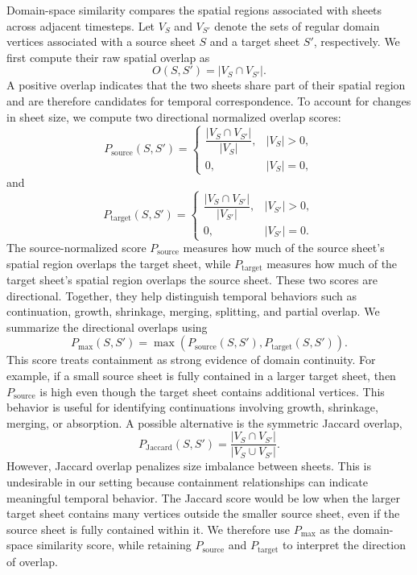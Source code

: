 \documentclass{vgtc}                          %
\newcommand{\Sheet}{S}
\begin{document}
Domain-space similarity compares the spatial regions associated with sheets across adjacent timesteps. Let $V_\Sheet$ and $V_{\Sheet'}$ denote the sets of regular domain vertices associated with a source sheet $\Sheet$ and a target sheet $\Sheet'$, respectively. We first compute their raw spatial overlap as
\[
O(\Sheet,\Sheet') = |V_\Sheet \cap V_{\Sheet'}|.
\]
A positive overlap indicates that the two sheets share part of their spatial region and are therefore candidates for temporal correspondence. To account for changes in sheet size, we compute two directional normalized overlap scores:
\[
P_\mathrm{source}(\Sheet,\Sheet') =
\begin{cases}
\dfrac{|V_\Sheet \cap V_{\Sheet'}|}{|V_\Sheet|}, & |V_\Sheet| > 0,\\
0, & |V_\Sheet| = 0,
\end{cases}
\]
and
\[
P_\mathrm{target}(\Sheet,\Sheet') =
\begin{cases}
\dfrac{|V_\Sheet \cap V_{\Sheet'}|}{|V_{\Sheet'}|}, & |V_{\Sheet'}| > 0,\\
0, & |V_{\Sheet'}| = 0.
\end{cases}
\]
The source-normalized score $P_\mathrm{source}$ measures how much of the source sheet's spatial region overlaps the target sheet, while $P_\mathrm{target}$ measures how much of the target sheet's spatial region overlaps the source sheet. These two scores are directional. Together, they help distinguish temporal behaviors such as continuation, growth, shrinkage, merging, splitting, and partial overlap. We summarize the directional overlaps using
\[
P_\mathrm{max}(\Sheet,\Sheet') =
\max(P_\mathrm{source}(\Sheet,\Sheet'),
P_\mathrm{target}(\Sheet,\Sheet')).
\]
This score treats containment as strong evidence of domain continuity. For example, if a small source sheet is fully contained in a larger target sheet, then $P_\mathrm{source}$ is high even though the target sheet contains additional vertices. This behavior is useful for identifying continuations involving growth, shrinkage, merging, or absorption. A possible alternative is the symmetric Jaccard overlap,
\[
P_\mathrm{Jaccard}(\Sheet,\Sheet') =
\frac{|V_\Sheet \cap V_{\Sheet'}|}
{|V_\Sheet \cup V_{\Sheet'}|}.
\]
However, Jaccard overlap penalizes size imbalance between sheets. This is undesirable in our setting because containment relationships can indicate meaningful temporal behavior. The Jaccard score would be low when the larger target sheet contains many vertices outside the smaller source sheet, even if the source sheet is fully contained within it. We therefore use $P_\mathrm{max}$ as the domain-space similarity score, while retaining $P_\mathrm{source}$ and $P_\mathrm{target}$ to interpret the direction of overlap.
\end{document}
